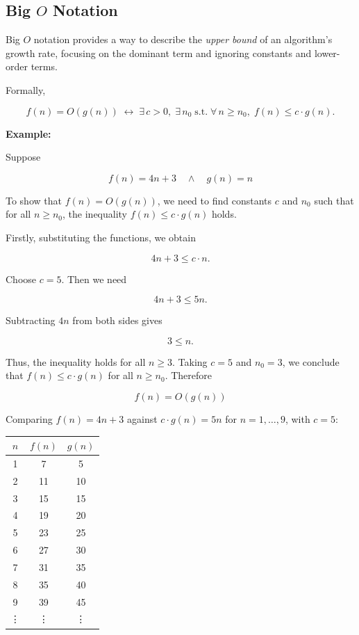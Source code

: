 \documentclass[12pt,a4paper,openany]{article}
\begin{document}
\subsection{Big $O$ Notation}

Big $O$ notation provides a way to describe the \emph{upper bound} of an algorithm's growth rate, focusing on the dominant term and ignoring constants and lower-order terms.

Formally, 

\[
f(n) = O(g(n))
\;\leftrightarrow\;
\exists\, c > 0,\; \exists\, n_0
\;\text{s.t.}\;
\forall\, n \ge n_0,\;
f(n) \le c \cdot g(n).
\]

\textbf{Example:}

Suppose

\[
f(n) = 4n + 3 \quad \land \quad g(n) = n
\]

To show that \( f(n) = O(g(n)) \), we need to find constants \( c \) and \( n_0 \) such that for all \( n \ge n_0 \), the inequality
$f(n) \le c \cdot g(n)$ holds.

Firstly, substituting the functions, we obtain

\[
4n + 3 \le c \cdot n.
\]

Choose \( c = 5 \). Then we need

\[
4n + 3 \le 5n.
\]

Subtracting \( 4n \) from both sides gives

\[
3 \le n.
\]

Thus, the inequality holds for all \( n \ge 3 \). Taking \( c = 5 \) and \( n_0 = 3 \), we conclude that \( f(n) \le c \cdot g(n) \) for all \( n \ge n_0 \).
Therefore

\[\boxed{f(n) = O(g(n))}\]


Comparing $f(n) = 4n + 3$ against $c \cdot g(n) = 5n$ for $n = 1, \ldots, 9$, with $c = 5$:

\begin{table}[h]
\centering
\begin{tabular}{|c|c|c|}
\hline
\textbf{$n$} & \textbf{$f(n)$} & \textbf{$g(n)$} \\
\hline
1 & 7  & 5  \\
2 & 11 & 10 \\
3 & 15 & 15 \\
4 & 19 & 20 \\
5 & 23 & 25 \\
6 & 27 & 30 \\
7 & 31 & 35 \\
8 & 35 & 40 \\
9 & 39 & 45 \\
\vdots & \vdots & \vdots \\ 
\hline
\end{tabular}
\end{table}
\end{document}
